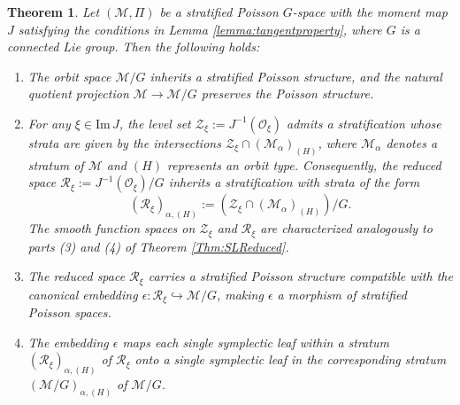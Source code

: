 \documentclass[12pt]{amsart}
\newtheorem{theorem}{Theorem}[section]
\theoremstyle{definition}
\numberwithin{equation}{section}
\def\Im{\mathrm{Im}\,}
\newcommand{\Oxi}{\mathcal{O}_{\xi}}
\newcommand{\Zxi}{\mathcal{Z}_{\xi}}
\newcommand{\Reducedxi}{\mathcal{R}_\xi}
\begin{document}
	
	\begin{theorem}\label{Thm:Poissonreducedspace} 
		Let $(\mathcal{M},\Pi)$ be a stratified Poisson $G$-space with the moment map $J$ satisfying the conditions in Lemma \ref{lemma:tangentproperty}, where $G$ is a connected Lie group. Then the following holds:		
		\begin{enumerate}
			\item[(1)] The orbit space $\mathcal{M}/G$ inherits a stratified Poisson structure, and the natural quotient projection $\mathcal{M}\to \mathcal{M}/G$ preserves the Poisson structure.
			
			\item[(2)] For any $\xi\in \Im J$, the level set $\Zxi:=J^{-1}(\Oxi)$ admits a stratification whose strata are given by the intersections $\Zxi\cap (\mathcal{M}_{\alpha})_{(H)}$, where $\mathcal{M}_{\alpha}$ denotes a stratum of $\mathcal{M}$ and $(H)$ represents an orbit type. Consequently, the reduced space $\Reducedxi:=J^{-1}(\Oxi)/G$ inherits a stratification with strata of the form
		$$(\Reducedxi)_{\alpha,(H)}:=(\Zxi\cap (\mathcal{M}_{\alpha})_{(H)})/G.$$
			The smooth function spaces on $\Zxi$ and $\Reducedxi$ are characterized analogously to parts (3) and (4) of Theorem \ref{Thm:SLReduced}.
			
			\item[(3)] The reduced space $\Reducedxi$ carries a stratified Poisson structure compatible with the canonical embedding $\epsilon:\Reducedxi\hookrightarrow \mathcal{M}/G$, making $\epsilon$ a morphism of stratified Poisson spaces.
			
			\item[(4)] The embedding $\epsilon$ maps each single symplectic leaf within a stratum $(\Reducedxi)_{\alpha,(H)}$ of $\Reducedxi$ onto a single symplectic leaf in the corresponding stratum $(\mathcal{M}/G)_{\alpha,(H)}$ of $\mathcal{M}/G$.
		\end{enumerate}
		
	\end{theorem}  
	
\end{document}
